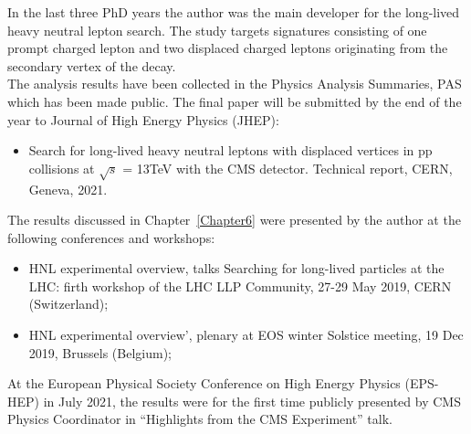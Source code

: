 In the last three PhD years the author was the main developer for the
long-lived heavy neutral lepton search. The study targets signatures
consisting of one prompt charged lepton and two displaced
charged leptons originating from the secondary vertex of the \hnl
decay.\\
The analysis results have been collected in the Physics Analysis
Summaries, PAS which has been made public. The final paper will be
submitted by the end of the year to Journal
of High Energy Physics (JHEP):
\begin{itemize}
\setlength\itemsep{-0.1em}
\item Search for long-lived heavy neutral leptons with displaced vertices in pp collisions at $\sqrt{s}$ =
13TeV with the CMS detector. Technical report, CERN, Geneva, 2021.
\end{itemize}

The results discussed in Chapter~\ref{Chapter6} were presented by the author at the following
conferences and workshops:

\begin{itemize}
\setlength\itemsep{-0.1em}
\item HNL experimental overview, talks Searching for long-lived
  particles at the LHC: firth workshop of the LHC LLP Community, 27-29
  May 2019, CERN (Switzerland);
\item HNL experimental overview', plenary at EOS winter Solstice
  meeting, 19 Dec 2019, Brussels (Belgium);
\end{itemize}

At the European Physical Society Conference on High Energy Physics
(EPS-HEP) in July 2021, the results were for the first time publicly
presented by CMS Physics Coordinator in ``Highlights from the CMS
Experiment'' talk.

